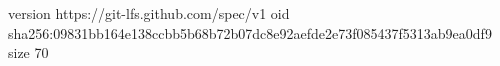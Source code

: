 version https://git-lfs.github.com/spec/v1
oid sha256:09831bb164e138ccbb5b68b72b07dc8e92aefde2e73f085437f5313ab9ea0df9
size 70
